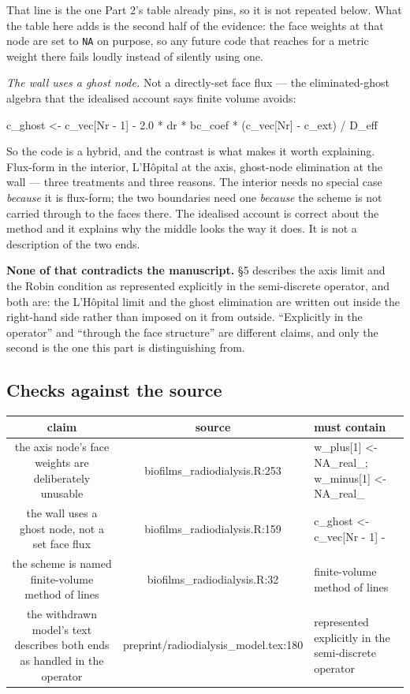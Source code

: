\documentclass[11pt]{article}
\newcommand{\us}{\_\allowbreak}
\newcommand{\checkhead}{%
  \toprule
  \textbf{\normalsize claim} & \textbf{\normalsize source} & \textbf{\normalsize must contain} \\
  \midrule
}
\begin{document}
That line is the one Part 2's table already pins, so it is not repeated below. What the table
here adds is the second half of the evidence: the face weights at that node are set to
\texttt{NA} on purpose, so any future code that reaches for a metric weight there fails
loudly instead of silently using one.

\emph{The wall uses a ghost node.} Not a directly-set face flux — the eliminated-ghost
algebra that the idealised account says finite volume avoids:

\begin{code}
c_ghost <- c_vec[Nr - 1] -
  2.0 * dr * bc_coef * (c_vec[Nr] - c_ext) / D_eff
\end{code}

So the code is a hybrid, and the contrast is what makes it worth explaining. Flux-form in the
interior, L'Hôpital at the axis, ghost-node elimination at the wall — three treatments and
three reasons. The interior needs no special case \emph{because} it is flux-form; the two
boundaries need one \emph{because} the scheme is not carried through to the faces there. The
idealised account is correct about the method and it explains why the middle looks the way it
does. It is not a description of the two ends.

\textbf{None of that contradicts the manuscript.} \S5 describes the axis limit and the Robin
condition as represented explicitly in the semi-discrete operator, and both are: the
L'Hôpital limit and the ghost elimination are written out inside the right-hand side rather
than imposed on it from outside. ``Explicitly in the operator'' and ``through the face
structure'' are different claims, and only the second is the one this part is distinguishing
from.

\subsection*{Checks against the source}

\begin{longtable}{CSF}
\checkhead
\endhead
the axis node's face weights are deliberately unusable
  & biofilms\us radiodialysis.R:253
  & w\_plus[1] <- NA\_real\_; w\_minus[1] <- NA\_real\_ \\[0.35em]
the wall uses a ghost node, not a set face flux
  & biofilms\us radiodialysis.R:159
  & c\_ghost <- c\_vec[Nr - 1] - \\[0.35em]
the scheme is named finite-volume method of lines
  & biofilms\us radiodialysis.R:32
  & finite-volume method of lines \\[0.35em]
the withdrawn model's text describes both ends as handled in the operator
  & preprint/radiodialysis\us model.tex:180
  & represented explicitly in the semi-discrete operator \\
\bottomrule
\end{longtable}
\end{document}
